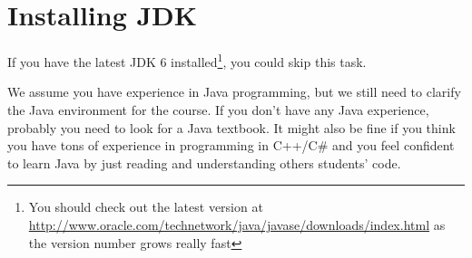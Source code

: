 
\section{Installing JDK}

If you have the latest JDK 6 installed\footnote{You should check out the latest
version at
\url{http://www.oracle.com/technetwork/java/javase/downloads/index.html} as the
version number grows really fast}, you could skip this task.

We assume you have experience in Java programming, but we still need to clarify
the Java environment for the course. If you don't have any Java experience,
probably you need to look for a Java textbook. It might also be fine if you
think you have tons of experience in programming in C++/C\# and you feel
confident to learn Java by just reading and understanding others students' code.

